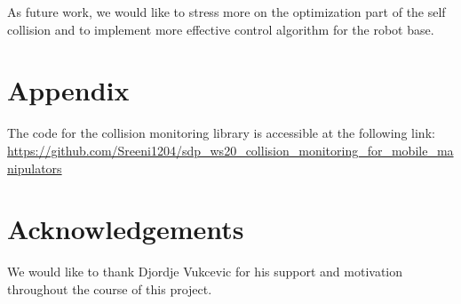 \documentclass[a4paper, 11.5pt, conference]{ieeeconf}      %
\begin{document}
As future work, we would like to stress more on the optimization part of the self collision and to implement more effective control algorithm for the robot base.

\addtolength{\textheight}{-12cm}   %




\section*{Appendix}
The code for the collision monitoring library is accessible at the following link: \url{https://github.com/Sreeni1204/sdp\_ws20\_collision\_monitoring\_for\_mobile\_manipulators}

\section*{Acknowledgements}
We would like to thank Djordje Vukcevic for his support and motivation throughout the course of this project.

\end{document}

